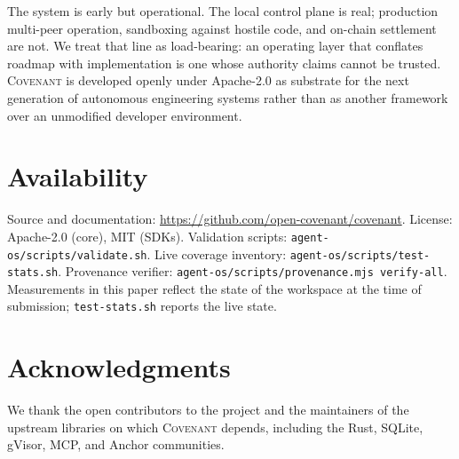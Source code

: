 \documentclass[11pt]{article}
\theoremstyle{plainsmall}
\begin{document}
The system is early but operational. The local control plane is real; production multi-peer operation, sandboxing against hostile code, and on-chain settlement are not. We treat that line as load-bearing: an operating layer that conflates roadmap with implementation is one whose authority claims cannot be trusted. \textsc{Covenant} is developed openly under Apache-2.0 as substrate for the next generation of autonomous engineering systems rather than as another framework over an unmodified developer environment.

\section*{Availability}

Source and documentation: \url{https://github.com/open-covenant/covenant}. License: Apache-2.0 (core), MIT (SDKs). Validation scripts: \texttt{agent-os/scripts/validate.sh}. Live coverage inventory: \texttt{agent-os/scripts/test-stats.sh}. Provenance verifier: \texttt{agent-os/scripts/provenance.mjs verify-all}. Measurements in this paper reflect the state of the workspace at the time of submission; \texttt{test-stats.sh} reports the live state.

\section*{Acknowledgments}

We thank the open contributors to the project and the maintainers of the upstream libraries on which \textsc{Covenant} depends, including the Rust, SQLite, gVisor, MCP, and Anchor communities.



\end{document}
